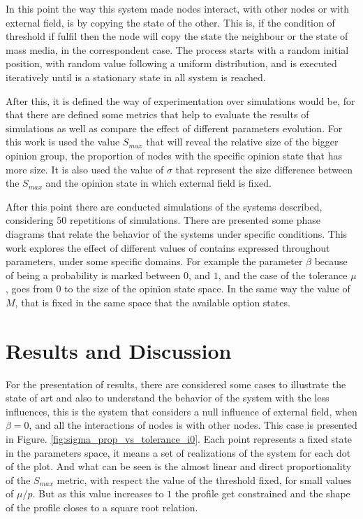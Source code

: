 \documentclass[%
 reprint,
 amsmath,amssymb,
 aps,
]{revtex4-2}
\begin{document}
In this point the way this system made nodes interact, with other nodes or with external field, is by copying the state of the other. This is, if the condition of threshold if fulfil then the node will copy the state the neighbour or the state of mass media, in the correspondent case. The process starts with a random initial position, with random value following a uniform distribution, and is executed iteratively until is a stationary state in all system is reached.

After this, it is defined the way of experimentation over simulations would be, for that there are defined some metrics that help to evaluate the results of simulations as well as compare the effect of different parameters evolution. For this work is used the value $S_{max}$ that will reveal the relative size of the bigger opinion group, the proportion of nodes with the specific opinion state that has more size. It is also used the value of $\sigma$ that represent the size difference between the $S_{max}$ and the opinion state in which external field is fixed. 

After this point there are conducted simulations of the systems described, considering $50$ repetitions of simulations. There are presented some phase diagrams that relate the behavior of the systems under specific conditions. This work explores the effect of different values of contains expressed throughout parameters, under some specific domains. For example the parameter $\beta$ because of being a probability is marked between $0$, and $1$, and the case of the tolerance $\mu$, goes from $0$ to the size of the opinion state space. In the same way the value of $M$, that is fixed in the same space that the available option states. 


\section{Results and Discussion}


For the presentation of results, there are considered some cases to illustrate the state of art and also to understand the behavior of the system with the less influences, this is the system that considers a null influence of external field, when $\beta =0$, and all the interactions of nodes is with other nodes. This case is presented in Figure. \ref{fig:sigma_prop_vs_tolerance_i0}. Each point represents a fixed state in the parameters space, it means a set of realizations of the system for each dot of the plot. And what can be seen is the almost linear and direct proportionality of the $S_{max}$ metric, with respect the value of the threshold fixed, for small values of $\mu/p$. But as this value increases to $1$ the profile get constrained and the shape of the profile closes to a square root relation.
\end{document}
